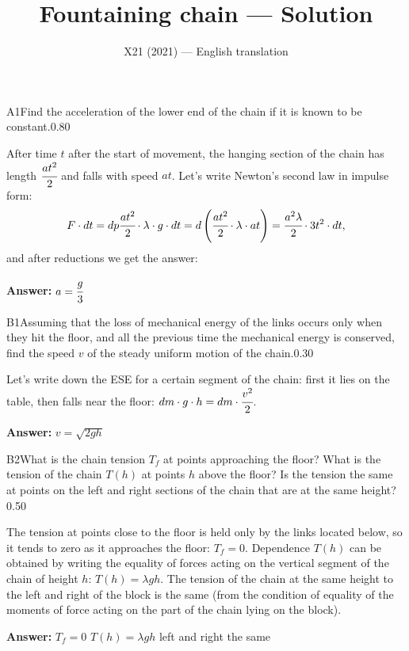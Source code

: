 \documentclass[11pt,a4paper]{article}
\title{\textbf{Fountaining chain --- Solution}}
\author{\normalsize X21 (2021) — English translation}
\date{}
\begin{document}
\maketitle\vspace{-0.5em}
\begin{solcard}{A1}{Find the acceleration of the lower end of the chain if it is known to be constant.}{0.80}

After time $t$ after the start of movement, the hanging section of the chain has length $\cfrac{at^2}{2}$ and falls with speed $at$. Let's write Newton's second law in impulse form: $$F \cdot dt = dp \\ \cfrac{at^2}{2} \cdot \lambda \cdot g \cdot dt = d\left(\cfrac{at^2}{2} \cdot \lambda \cdot at\right) = \cfrac{a^2\lambda}{2} \cdot 3t^2 \cdot dt ,$$ and after reductions we get the answer:

\par\smallskip\noindent\textbf{Answer:} $a=\cfrac{g}{3}$
\end{solcard}

\begin{solcard}{B1}{Assuming that the loss of mechanical energy of the links occurs only when they hit the floor, and all the previous time the mechanical energy is conserved, find the speed $v$ of the steady uniform motion of the chain.}{0.30}

Let's write down the ESE for a certain segment of the chain: first it lies on the table, then falls near the floor: $dm \cdot g \cdot h = dm \cdot \cfrac {v^2}{2}$.

\par\smallskip\noindent\textbf{Answer:} $v=\sqrt{2gh}$
\end{solcard}

\begin{solcard}{B2}{What is the chain tension $T_f$ at points approaching the floor? What is the tension of the chain $T(h)$ at points $h$ above the floor? Is the tension the same at points on the left and right sections of the chain that are at the same height?}{0.50}

The tension at points close to the floor is held only by the links located below, so it tends to zero as it approaches the floor: $T_f = 0$. Dependence $T(h)$ can be obtained by writing the equality of forces acting on the vertical segment of the chain of height $h$: $T(h)=\lambda gh$. The tension of the chain at the same height to the left and right of the block is the same (from the condition of equality of the moments of force acting on the part of the chain lying on the block).

\par\smallskip\noindent\textbf{Answer:} $T_f=0$ $T(h) = \lambda gh$ left and right the same
\end{solcard}
\end{document}
